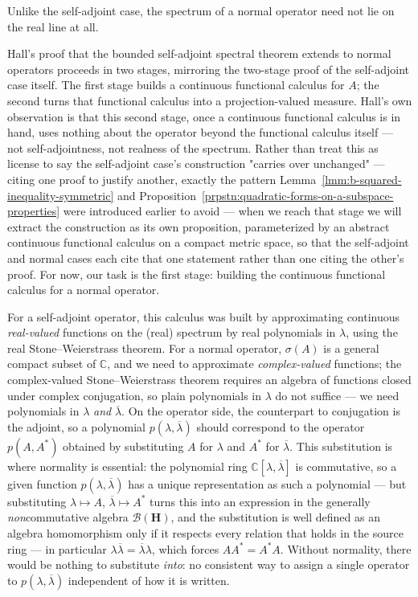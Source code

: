  Unlike the self-adjoint case, the spectrum of a normal operator need not lie on the real line at all.

Hall's proof that the bounded self-adjoint spectral theorem extends to normal operators proceeds in two stages, mirroring the two-stage proof of the self-adjoint case itself. The first stage builds a continuous functional calculus for $A$; the second turns that functional calculus into a projection-valued measure. Hall's own observation is that this second stage, once a continuous functional calculus is in hand, uses nothing about the operator beyond the functional calculus itself — not self-adjointness, not realness of the spectrum. Rather than treat this as license to say the self-adjoint case's construction "carries over unchanged" — citing one proof to justify another, exactly the pattern Lemma~\ref{lmm:b-squared-inequality-symmetric} and Proposition~\ref{prpstn:quadratic-forms-on-a-subspace-properties} were introduced earlier to avoid — when we reach that stage we will extract the construction as its own proposition, parameterized by an abstract continuous functional calculus on a compact metric space, so that the self-adjoint and normal cases each cite that one statement rather than one citing the other's proof. For now, our task is the first stage: building the continuous functional calculus for a normal operator.

For a self-adjoint operator, this calculus was built by approximating continuous \textit{real-valued} functions on the (real) spectrum by real polynomials in $\lambda$, using the real Stone–Weierstrass theorem. For a normal operator, $\sigma(A)$ is a general compact subset of $\mathbb{C}$, and we need to approximate \textit{complex-valued} functions; the complex-valued Stone–Weierstrass theorem requires an algebra of functions closed under complex conjugation, so plain polynomials in $\lambda$ do not suffice — we need polynomials in $\lambda$ \textit{and} $\overline{\lambda}$. On the operator side, the counterpart to conjugation is the adjoint, so a polynomial $p(\lambda,\overline\lambda)$ should correspond to the operator $p(A,A^*)$ obtained by substituting $A$ for $\lambda$ and $A^*$ for $\overline\lambda$. This substitution is where normality is essential: the polynomial ring $\mathbb{C}[\lambda,\overline\lambda]$ is commutative, so a given function $p(\lambda,\overline\lambda)$ has a unique representation as such a polynomial — but substituting $\lambda \mapsto A$, $\overline\lambda \mapsto A^*$ turns this into an expression in the generally \textit{non}commutative algebra $\mathcal{B}(\mathbf{H})$, and the substitution is well defined as an algebra homomorphism only if it respects every relation that holds in the source ring — in particular $\lambda\overline\lambda = \overline\lambda\lambda$, which forces $AA^* = A^*A$. Without normality, there would be nothing to substitute \textit{into}: no consistent way to assign a single operator to $p(\lambda,\overline\lambda)$ independent of how it is written.

